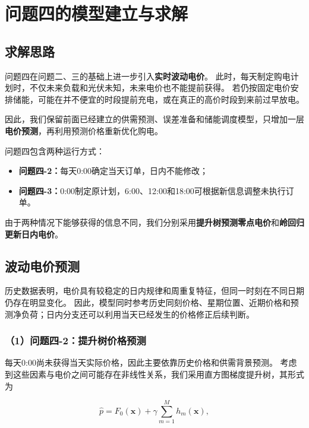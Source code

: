\section{问题四的模型建立与求解}

\subsection{求解思路}

问题四在问题二、三的基础上进一步引入\textbf{实时波动电价}。
此时，每天制定购电计划时，不仅未来负载和光伏未知，未来电价也不能提前获得。
若仍按固定电价安排储能，可能在并不便宜的时段提前充电，或在真正的高价时段到来前过早放电。

因此，我们保留前面已经建立的供需预测、误差准备和储能调度模型，只增加一层\textbf{电价预测}，再利用预测价格重新优化购电。

问题四包含两种运行方式：

\begin{itemize}
    \item \textbf{问题四-2：}每天0:00确定当天订单，日内不能修改；
    \item \textbf{问题四-3：}0:00制定原计划，6:00、12:00和18:00可根据新信息调整未执行订单。
\end{itemize}

由于两种情况下能够获得的信息不同，我们分别采用\textbf{提升树预测零点电价}和\textbf{岭回归更新日内电价}。


\subsection{波动电价预测}

历史数据表明，电价具有较稳定的日内规律和周重复特征，但同一时刻在不同日期仍存在明显变化。
因此，模型同时参考历史同刻价格、星期位置、近期价格和预测净负荷；日内分支还可以利用当天已经发生的价格修正后续判断。

\subsubsection*{（1）问题四-2：提升树价格预测}

每天0:00尚未获得当天实际价格，因此主要依靠历史价格和供需背景预测。
考虑到这些因素与电价之间可能存在非线性关系，我们采用直方图梯度提升树，其形式为

\begin{equation}
\hat{p}
=
F_0(\mathbf{x})
+
\gamma
\sum_{m=1}^{M}
h_m(\mathbf{x}),
\end{equation}

